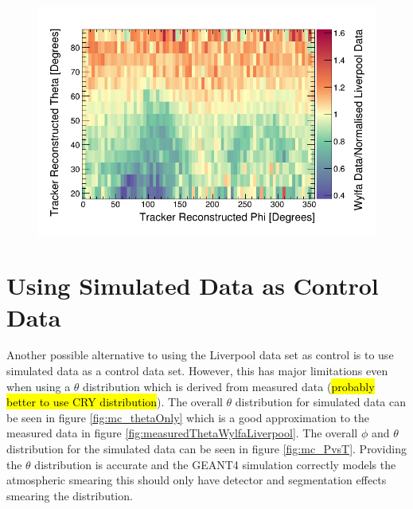 \begin{figure}[!h]
 \centering
 \includegraphics[width=\linewidth]{Chapter5/Figs/cosmicTrackerUncertainties/20CutRatioWylfaDivLiv.png}
 \label{fig:20CutRatioWylfaDivLiv}
\end{figure}

\section{Using Simulated Data as Control Data}\label{sec:usingSimulatedDataAsControlData}
Another possible alternative to using the Liverpool data set as control is to use simulated data as a control data set. However, this has major limitations even when using a $\theta$ distribution which is derived from measured data (\hl{probably better to use CRY distribution}). The overall $\theta$ distribution for simulated data can be seen in figure \ref{fig:mc_thetaOnly} which is a good approximation to the measured data in figure \ref{fig:measuredThetaWylfaLiverpool}. The overall $\phi$ and $\theta$ distribution for the simulated data can be seen in figure \ref{fig:mc_PvsT}. Providing the $\theta$ distribution is accurate and the GEANT4 simulation correctly models the atmospheric smearing this should only have detector and segmentation effects smearing the distribution. 

